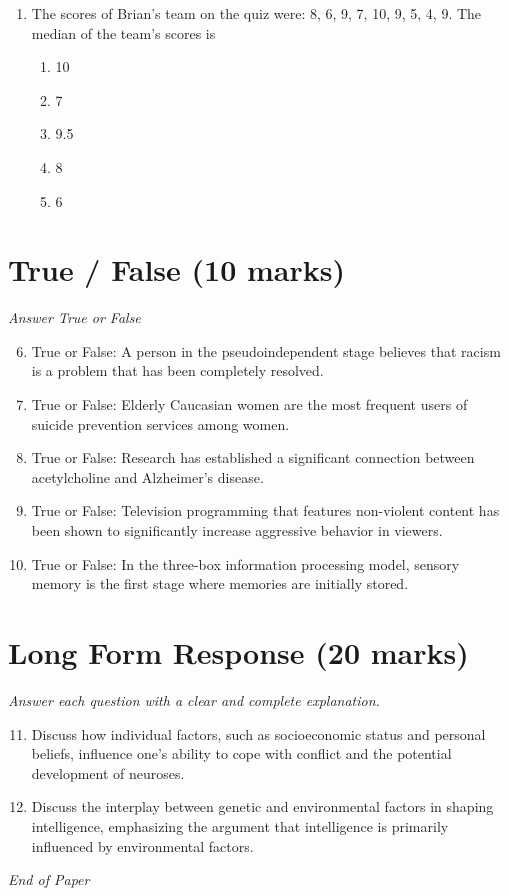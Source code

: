 \documentclass[12pt]{article}
\begin{document}
\begin{enumerate}[label=\arabic*.]
\begin{enumerate}[label=(\alph*)]
    \item Adlerian
    \item reality
    \item person-centered
    \item existential
    \item Gestalt
\end{enumerate}
\item The scores of Brian's team on the quiz were: 8, 6, 9, 7, 10, 9, 5, 4, 9. The median of the team's scores is
\begin{enumerate}[label=(\alph*)]
    \item 10
    \item 7
    \item 9.5
    \item 8
    \item 6
\end{enumerate}
\end{enumerate}

\section*{True / False (10 marks)}
\textit{Answer True or False}
\begin{enumerate}[label=\arabic*.]
\setcounter{enumi}{5}
\item True or False: A person in the pseudoindependent stage believes that racism is a problem that has been completely resolved.
\item True or False: Elderly Caucasian women are the most frequent users of suicide prevention services among women.
\item True or False: Research has established a significant connection between acetylcholine and Alzheimer's disease.
\item True or False: Television programming that features non-violent content has been shown to significantly increase aggressive behavior in viewers.
\item True or False: In the three-box information processing model, sensory memory is the first stage where memories are initially stored.
\end{enumerate}

\section*{Long Form Response (20 marks)}
\textit{Answer each question with a clear and complete explanation.}
\begin{enumerate}[label=\arabic*.]
\setcounter{enumi}{10}
\item Discuss how individual factors, such as socioeconomic status and personal beliefs, influence one's ability to cope with conflict and the potential development of neuroses.
\item Discuss the interplay between genetic and environmental factors in shaping intelligence, emphasizing the argument that intelligence is primarily influenced by environmental factors.
\end{enumerate}

\vfill
\noindent\textit{End of Paper}
\end{document}

